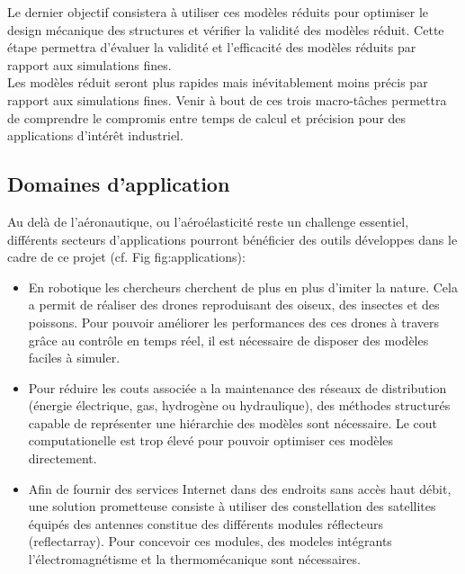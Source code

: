 \documentclass[french]{article}
\begin{document}
Le dernier objectif consistera \`a utiliser ces modèles réduits pour optimiser le design mécanique des structures et vérifier la validité des modèles réduit.  Cette étape permettra d'évaluer la validité et l'efficacit\'e des modèles réduits par rapport aux simulations fines. \\


Les modèles réduit seront plus rapides mais inévitablement moins précis par rapport aux simulations fines. Venir à bout de ces trois macro-tâches permettra de comprendre le compromis entre temps de calcul et précision pour des applications d'intérêt industriel. 

\subsection{Domaines d'application}

Au delà de l'aéronautique, ou l'aéroélasticité reste un challenge essentiel, différents secteurs d'applications pourront bénéficier des outils développes dans le cadre de ce projet (cf. Fig {fig:applications}): \\
\begin{itemize}
	\item En robotique les chercheurs cherchent de plus en plus d'imiter la nature. Cela a permit de réaliser des drones reproduisant des oiseux, des insectes et des poissons. Pour pouvoir améliorer les performances des ces drones à travers grâce au contrôle en temps réel, il est nécessaire de disposer des modèles faciles à simuler. 
	\item Pour réduire les couts associée a la maintenance des réseaux de distribution (énergie électrique, gas, hydrogène ou hydraulique), des méthodes structurés capable de représenter une hiérarchie des modèles sont nécessaire. Le cout computationelle est trop élevé pour pouvoir optimiser ces modèles directement.
	\item Afin de fournir des services Internet dans des endroits sans accès haut débit, une solution prometteuse consiste à utiliser des constellation des satellites équipés des antennes constitue des différents modules réflecteurs (reflectarray). Pour concevoir ces modules, des modeles intégrants l'électromagnétisme et la thermomécanique sont nécessaires.
\end{itemize}
\end{document}
